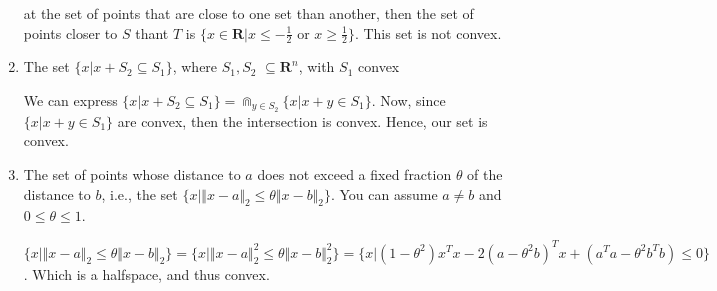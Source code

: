 \begin{enumerate}[label=(\alph*)]
{\begin{sol}
      at the set of points that are close to one set than another, then
      the set of points closer to $S$ thant $T$ is
      $\{x \in \mathbf{R} \vert x \leq -\frac{1}{2} \mbox{ or } x \geq \frac{1}{2}\}$. This set is not convex.
  \end{sol}}    
  \item{The set $\{x \vert x + S_{2} \subseteq S_{1}\}$, where $S_{1},S_{2}$
    $\subseteq \mathbf{R}^{n}$, with $S_{1}$ convex\\
    \begin{sol}
      We can express $\{x \vert x + S_{2} \subseteq S_{1}\} = \Cap_{y \in S_{2}} \{ x \vert x + y \in S_{1}\}$. Now, since $\{ x \vert x + y \in S_{1}\}$ are convex, then the intersection is convex. Hence, our set is convex.
  \end{sol}}    
  \item{The set of points whose distance to $a$ does not exceed a fixed fraction
    $\theta$ of the distance to $b$, i.e., the set
    $\{x \vert \Vert x -a \Vert_{2} \leq \theta \Vert x - b \Vert_{2} \}$.
    You can assume $a \neq b$ and $0 \leq \theta \leq 1$.\\
    \begin{sol}
      $\{x \vert \Vert x -a \Vert_{2} \leq \theta \Vert x - b \Vert_{2} \} = \{x \vert \Vert x -a \Vert^{2}_{2} \leq \theta \Vert x - b \Vert^{2}_{2} \} = \{x \vert (1-\theta^{2})x^{T}x - 2(a - \theta^{2}b)^{T}x +(a^{T}a - \theta^{2}b^{T}b) \leq 0 \}$. Which is a halfspace, and thus convex.
  \end{sol}}    
  \end{enumerate}
